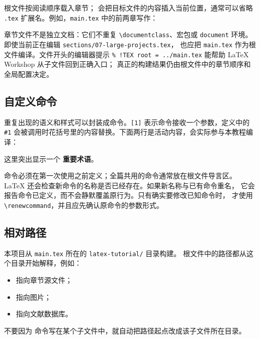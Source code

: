 根文件按阅读顺序载入章节；\verb|| 会把目标文件的内容插入当前位置，通常可以省略
\texttt{.tex} 扩展名。例如，\texttt{main.tex} 中的前两章写作：

\begin{codeblock}


\end{codeblock}

章节文件不是独立文档：它们不重复 \verb|\documentclass|、宏包或
\verb|document| 环境。即使当前正在编辑 \texttt{sections/07-large-projects.tex}，
也应把 \texttt{main.tex} 作为根文件编译。文件开头的编辑器提示
\verb|% !TEX root = ../main.tex| 能帮助 LaTeX Workshop 从子文件回到正确入口；
真正的构建结果仍由根文件中的章节顺序和全局配置决定。

\subsection{自定义命令}

重复出现的语义和样式可以封装成命令。\verb|[1]| 表示命令接收一个参数，定义中的
\verb|#1| 会被调用时花括号里的内容替换。下面两行是活动内容，会实际参与本教程编译：

\newcommand{\importantterm}[1]{\textcolor{TutorialBlue}{\textbf{#1}}}
这里突出显示一个 \importantterm{重要术语}。

命令必须在第一次使用之前定义；全篇共用的命令通常放在根文件导言区。
LaTeX 还会检查新命令的名称是否已经存在。如果新名称与已有命令重名，
它会报告命令已定义，而不会静默覆盖原行为。只有确实要修改已知命令时，
才使用 \texttt{\textbackslash renewcommand}，并且应先确认原命令的参数形式。

\subsection{相对路径}

本项目从 \texttt{main.tex} 所在的 \texttt{latex-tutorial/} 目录构建。
根文件中的路径都从这个目录开始解释，例如：
\begin{itemize}[leftmargin=2.6em]
    \item {} 指向章节源文件；
    \item {} 指向图片；
    \item {} 指向文献数据库。
\end{itemize}
不要因为 \verb|| 命令写在某个子文件中，就自动把路径起点改成该子文件所在目录。

